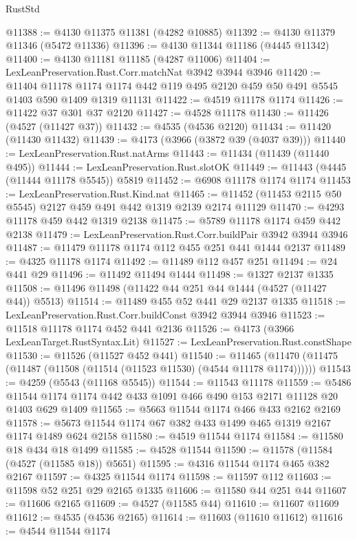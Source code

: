 \begin{lexlean}{RustStd}
\begin{coremodule}
{\begin{coremodule}
{{{{{{{{{{{{{{{{{{{{{{{{{{{{{{{{{{{{{{@11388 := @4130 @11375 @11381 (@4282 @10885)
@11392 := @4130 @11379 @11346 (@5472 @11336)
@11396 := @4130 @11344 @11186 (@4445 @11342)
@11400 := @4130 @11181 @11185 (@4287 @11006)
@11404 := LexLeanPreservation.Rust.Corr.matchNat @3942 @3944 @3946
@11420 := @11404
    @11178
    @1174
    @1174
    @442
    @119
    @495
    @2120
    @459
    @50
    @491
    @5545
    @1403
    @590
    @1409
    @1319
    @11131
@11422 := @4519 @11178 @1174
@11426 := @11422 @37 @301 @37 @2120
@11427 := @4528 @11178
@11430 := @11426 (@4527 (@11427 @37))
@11432 := @4535 (@4536 @2120)
@11434 := @11420 (@11430 @11432)
@11439 := @4173 (@3966 (@3872 @39 (@4037 @39)))
@11440 := LexLeanPreservation.Rust.natArms
@11443 := @11434 (@11439 (@11440 @495))
@11444 := LexLeanPreservation.Rust.slotOK
@11449 := @11443 (@4445 (@11444 @11178 @5545)) @5819
@11452 := @6908 @11178 @1174 @1174
@11453 := LexLeanPreservation.Rust.Kind.nat
@11465 := @11452 (@11453 @2115 @50 @5545) @2127 @459 @491 @442 @1319 @2139 @2174 @11129
@11470 := @4293 @11178 @459 @442 @1319 @2138
@11475 := @5789 @11178 @1174 @459 @442 @2138
@11479 := LexLeanPreservation.Rust.Corr.buildPair @3942 @3944 @3946
@11487 := @11479 @11178 @1174 @112 @455 @251 @441 @1444 @2137
@11489 := @4325 @11178 @1174
@11492 := @11489 @112 @457 @251
@11494 := @24 @441 @29
@11496 := @11492 @11494 @1444
@11498 := @1327 @2137 @1335
@11508 := @11496 @11498 (@11422 @44 @251 @44 @1444 (@4527 (@11427 @44)) @5513)
@11514 := @11489 @455 @52 @441 @29 @2137 @1335
@11518 := LexLeanPreservation.Rust.Corr.buildConst @3942 @3944 @3946
@11523 := @11518 @11178 @1174 @452 @441 @2136
@11526 := @4173 (@3966 LexLeanTarget.RustSyntax.Lit)
@11527 := LexLeanPreservation.Rust.constShape
@11530 := @11526 (@11527 @452 @441)
@11540 := @11465 (@11470 (@11475 (@11487 (@11508 (@11514 (@11523 @11530) (@4544 @11178 @1174))))))
@11543 := @4259 (@5543 (@11168 @5545))
@11544 := @11543 @11178
@11559 := @5486 @11544 @1174 @1174 @442 @433 @1091 @466 @490 @153 @2171 @11128 @20 @1403 @629 @1409
@11565 := @5663 @11544 @1174 @466 @433 @2162 @2169
@11578 := @5673 @11544 @1174 @67 @382 @433 @1499 @465 @1319 @2167 @1174 @1489 @624 @2158
@11580 := @4519 @11544 @1174
@11584 := @11580 @18 @434 @18 @1499
@11585 := @4528 @11544
@11590 := @11578 (@11584 (@4527 (@11585 @18)) @5651)
@11595 := @4316 @11544 @1174 @465 @382 @2167
@11597 := @4325 @11544 @1174
@11598 := @11597 @112
@11603 := @11598 @52 @251 @29 @2165 @1335
@11606 := @11580 @44 @251 @44
@11607 := @11606 @2165
@11609 := @4527 (@11585 @44)
@11610 := @11607 @11609
@11612 := @4535 (@4536 @2165)
@11614 := @11603 (@11610 @11612)
@11616 := @4544 @11544 @1174
}}}}}}}}}}}}}}}}}}}}}}}}}}}}}}}}}}}}}}
\end{coremodule}}
\end{coremodule}
\end{lexlean}
